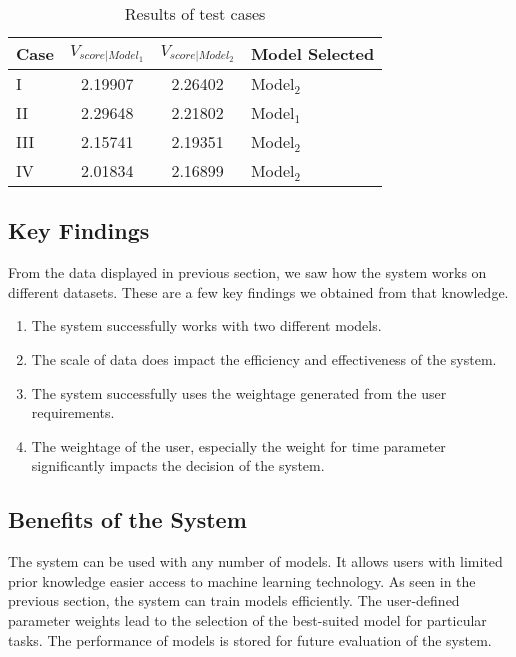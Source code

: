 \begin{table}[!hb]
    \caption{Results of test cases}\label{tab:results_of_test_cases}
    \begin{tabular*}{\tblwidth}{@{}LCCL@{}}
        \toprule
        Case & $V_{score|Model_1}$ & $V_{score|Model_2}$ & Model Selected \\
        \midrule
        I & 2.19907 & 2.26402 & Model$_2$ \\
        II & 2.29648 & 2.21802 & Model$_1$ \\
        III & 2.15741 & 2.19351 & Model$_2$ \\
        IV & 2.01834 & 2.16899 & Model$_2$ \\
        \bottomrule
    \end{tabular*}
\end{table}

\subsection{Key Findings}\label{subsec:key_findings}

From the data displayed in previous section, we saw how the system works on different datasets. These are a few key findings we obtained from that knowledge.
\begin{enumerate}
    \item The system successfully works with two different models.
    \item The scale of data does impact the efficiency and effectiveness of the system.
    \item The system successfully uses the weightage generated from the user requirements.
    \item The weightage of the user, especially the weight for time parameter significantly impacts the decision of the system.
\end{enumerate}

\subsection{Benefits of the System}\label{subsec:benefits_of_system}

The system can be used with any number of models. It allows users with limited prior knowledge easier access to machine learning technology. As seen in the previous section, the system can train models efficiently. The user-defined parameter weights lead to the selection of the best-suited model for particular tasks. The performance of models is stored for future evaluation of the system.

